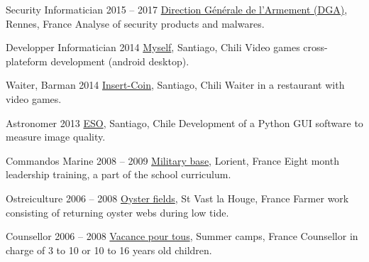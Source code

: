 \begin{joblist}

\item[Security Informatician]{2015 -- 2017}
	{\href{http://www.defense.gouv.fr/dga/}{Direction Générale de l'Armement (DGA)}, Rennes, France}
	{Analyse of security products and malwares.}


\item[Developper Informatician]{2014}
	{\href{https://play.google.com/store/apps/developer?id=tinmarino&hl=en}{Myself}, Santiago, Chili}
	{Video games cross-plateform development (android desktop).}


\item[Waiter, Barman]{2014}
	{\href{http://www.insertcoin.cl/}{Insert-Coin}, Santiago, Chili}
	{Waiter in a restaurant with video games.}


\item[Astronomer]{2013}
	{\href{http://www.eso.org/public/}{ESO}, Santiago, Chile}
	{Development of a Python GUI software to measure image quality.}


\item[Commandos Marine]{2008 -- 2009}
	{\href{http://www.defense.gouv.fr/marine/organisation/forces/fusiliers-marins-et-commandos/force-maritime-des-fusiliers-marins-et-commandos}{Military base}, Lorient, France}
	{Eight ­month leadership training, a part of the school curriculum.}


\item[Ostreiculture]{2006 -- 2008}
	{\href{http://huitresdesaintvaast.fr/}{Oyster fields}, St Vast la Houge, France}
	{Farmer work consisting of returning oyster webs during low tide.}


\item[Counsellor]{2006 -- 2008}
	{\href{http://www.vacances-pour-tous.org/}{Vacance pour tous}, Summer camps, France}
	{Counsellor in charge of 3 to 10 or 10 to 16 years old children.}
\end{joblist}


\begin{skilllist}



\end{skilllist}
